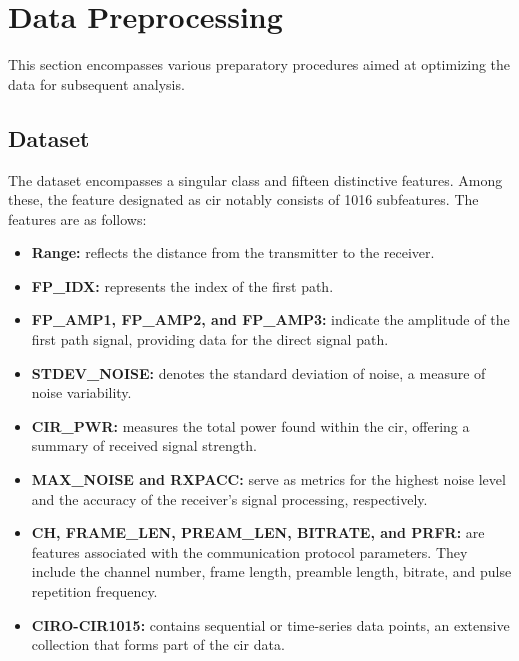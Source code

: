 \section{Data Preprocessing}\label{data_preprocessing}

This section encompasses various preparatory procedures aimed at optimizing the data for subsequent analysis. 

\subsection{Dataset}\label{dataset_given}

The dataset encompasses a singular class and fifteen distinctive features. Among these, the feature designated as \Gls{cir} notably consists of 1016 subfeatures. The features are as follows:

\begin{itemize}
    \item \textbf{Range:} reflects the distance from the transmitter to the receiver.
    \item \textbf{FP\_IDX:} represents the index of the first path.
    \item \textbf{FP\_AMP1, FP\_AMP2, and FP\_AMP3:} indicate the amplitude of the first path signal, providing data for the direct signal path.
    \item \textbf{STDEV\_NOISE:} denotes the standard deviation of noise, a measure of noise variability.
    \item \textbf{CIR\_PWR:} measures the total power found within the \acrshort{cir}, offering a summary of received signal strength.
    \item \textbf{MAX\_NOISE and RXPACC:} serve as metrics for the highest noise level and the accuracy of the receiver's signal processing, respectively.
    \item \textbf{CH, FRAME\_LEN, PREAM\_LEN, BITRATE, and PRFR:} are features associated with the communication protocol parameters. They include the channel number, frame length, preamble length, bitrate, and pulse repetition frequency.
    \item \textbf{CIRO-CIR1015:} contains sequential or time-series data points, an extensive collection that forms part of the \acrshort{cir} data.
\end{itemize}



